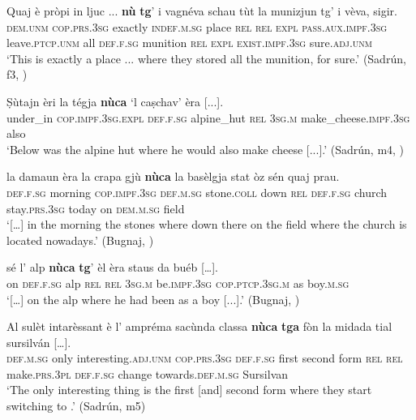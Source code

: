 \ea
\label{ex:relloc1}
\gll  Quaj è pròpi in ljuc ... \textbf{nù} \textbf{tg}’ i vagnéva schau tùt la munizjun tg’ i vèva, sigir.\\
\textsc{dem.unm} \textsc{cop.prs.3sg} exactly \textsc{indef.m.sg} place {} \textsc{rel} \textsc{rel} \textsc{expl} \textsc{pass.aux.impf.3sg} leave.\textsc{ptcp.unm} all \textsc{def.f.sg} munition \textsc{rel} \textsc{expl} \textsc{exist.impf.3sg} sure.\textsc{adj.unm}\\
\glt `This is exactly a place ... where they stored all the munition, for sure.' (Sadrún, f3, )
\z

\ea
\label{ex:relloc2}
\gll Ṣùtajn èri la tégja \textbf{nùca} `l caṣchav' èra [...].\\
under\_in \textsc{cop.impf.3sg.expl} \textsc{def.f.sg} alpine\_hut \textsc{rel} \textsc{3sg.m} make\_cheese.\textsc{impf.3sg} also\\
\glt `Below was the alpine hut where he would also make cheese [...].' (Sadrún, m4, )
\z

\ea
\label{ex:relloc3}
\gll    […] la damaun èra la crapa gjù \textbf{nùca} la basèlgja stat òz sén quaj prau.\\
{} \textsc{def.f.sg} morning \textsc{cop.impf.3sg} \textsc{def.m.sg} stone.\textsc{coll} down \textsc{rel} \textsc{def.f.sg} church stay.\textsc{prs.3sg} today on \textsc{dem.m.sg} field\\
\glt `[…] in the morning the stones where down there on the field where the church is located nowadays.' (Bugnaj, \citealt[134]{Büchli1966})
\z

\ea
\label{ex:relloc4}
\gll   […] sé l’ alp \textbf{nùca} \textbf{tg}’ èl èra staus da buéb […]. \\
     {}  on \textsc{def.f.sg} alp \textsc{rel} \textsc{rel} \textsc{3sg.m} be.\textsc{impf.3sg} \textsc{cop.ptcp.3sg.m} as boy.\textsc{m.sg} \\
\glt `[…] on the alp where he had been as a boy [...].' (Bugnaj, \citealt[145]{Büchli1966})
\z

\ea
\label{ex:relloc5}
\gll    Al sulèt intarèssant è l’ ampréma sacùnda classa \textbf{nùca} \textbf{tga} fòn la midada tial sursilván […].\\
\textsc{def.m.sg} only interesting.\textsc{adj.unm} \textsc{cop.prs.3sg} \textsc{def.f.sg} first second form \textsc{rel} \textsc{rel} make.\textsc{prs.3pl} \textsc{def.f.sg} change towards.\textsc{def.m.sg} Sursilvan\\
\glt `The only interesting thing is the first [and] second form where they start switching to .' (Sadrún, m5)
\z


